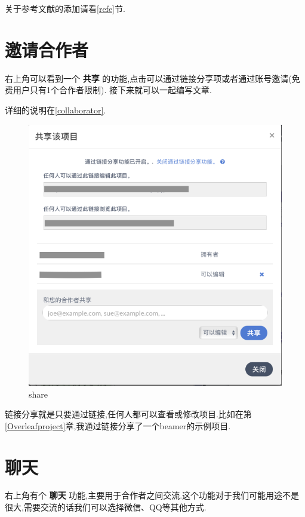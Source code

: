 \documentclass[]{ctexbook}
\begin{document}
关于参考文献的添加请看\ref{refe}节.

\hypertarget{section-6}{%
\section{邀请合作者}\label{section-6}}

右上角可以看到一个 \textbf{共享} 的功能,点击可以通过链接分享项或者通过账号邀请(免费用户只有1个合作者限制).
接下来就可以一起编写文章.

详细的说明在\ref{collaborator}.

\begin{figure}
\centering
\includegraphics{figure/share.png}
\caption{share}
\end{figure}

链接分享就是只要通过链接,任何人都可以查看或修改项目.比如在第\ref{Overleafproject}章,我通过链接分享了一个beamer的示例项目.

\hypertarget{section-7}{%
\section{聊天}\label{section-7}}

右上角有个 \textbf{聊天} 功能,主要用于合作者之间交流.这个功能对于我们可能用途不是很大,需要交流的话我们可以选择微信、QQ等其他方式.
\end{document}
